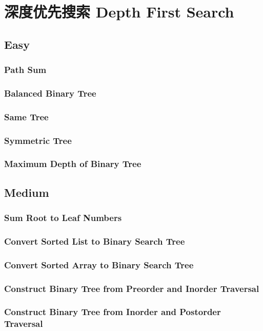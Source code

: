 \documentclass[12pt]{book}
\begin{document}
\chapter{深度优先搜索 Depth First Search}
\label{sec-8}
\section{Easy}
\label{sec-8-1}
\subsection{Path Sum}
\label{sec-8-1-1}
\subsection{Balanced Binary Tree}
\label{sec-8-1-2}
\subsection{Same Tree}
\label{sec-8-1-3}
\subsection{Symmetric Tree}
\label{sec-8-1-4}
\subsection{Maximum Depth of Binary Tree}
\label{sec-8-1-5}
\section{Medium}
\label{sec-8-2}
\subsection{Sum Root to Leaf Numbers}
\label{sec-8-2-1}
\subsection{Convert Sorted List to Binary Search Tree}
\label{sec-8-2-2}
\subsection{Convert Sorted Array to Binary Search Tree}
\label{sec-8-2-3}
\subsection{Construct Binary Tree from Preorder and Inorder Traversal}
\label{sec-8-2-4}
\subsection{Construct Binary Tree from Inorder and Postorder Traversal}
\label{sec-8-2-5}
\end{document}
